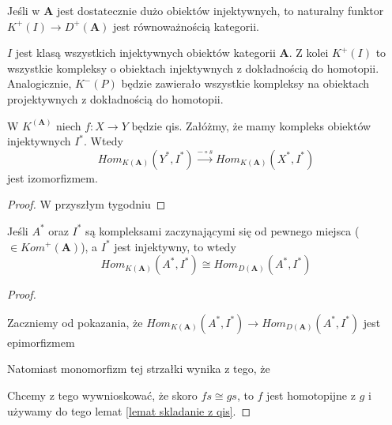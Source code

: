 \begin{theorem}
  Jeśli w $\mathbf{A}$ jest dostatecznie dużo obiektów injektywnych, to naturalny funktor 
  $K^+(I)\to D^+(\mathbf{A})$ jest równoważnością kategorii.
\end{theorem}

$I$ jest klasą wszystkich injektywnych obiektów kategorii $\mathbf{A}$. Z kolei $K^+(I)$ to wszystkie kompleksy o obiektach injektywnych z dokładnością do homotopii. Analogicznie, $K^-(P)$ będzie zawierało wszystkie kompleksy na obiektach projektywnych z dokładnością do homotopii.

\begin{lemma}\label{lemat skladanie z qis}
  W $K^(\mathbf{A})$ niech $f:X\to Y$ będzie qis. Załóżmy, że mamy kompleks obiektów injektywnych $I^*$. Wtedy
  $$Hom_{K(\mathbf{A})}(Y^*, I^*)\xrightarrow{-\circ s}Hom_{K(\mathbf{A})}(X^*, I^*)$$
  jest izomorfizmem. 
\end{lemma}

\begin{proof}
  W przyszłym tygodniu
\end{proof}

\begin{conclusion}\label{wniosek 11.10}
  Jeśli $A^*$ oraz $I^*$ są kompleksami zaczynającymi się od pewnego miejsca ($\in Kom^+(\mathbf{A})$), a $I^*$ jest injektywny, to wtedy
  $$Hom_{K(\mathbf{A})}(A^*, I^*)\cong Hom_{D(\mathbf{A})}(A^*, I^*)$$
\end{conclusion}

\begin{proof}
  \begin{center}\end{center}

  Zaczniemy od pokazania, że $Hom_{K(\mathbf{A})}(A^*, I^*)\to Hom_{D(\mathbf{A})}(A^*, I^*)$ jest epimorfizmem
  \begin{center}\end{center}
  
  Natomiast monomorfizm tej strzałki wynika z tego, że 
  \begin{center}\end{center}
  Chcemy z tego wywnioskować, że skoro $fs\cong gs$, to $f$ jest homotopijne z $g$ i używamy do tego lemat \ref{lemat skladanie z qis}.
\end{proof}
